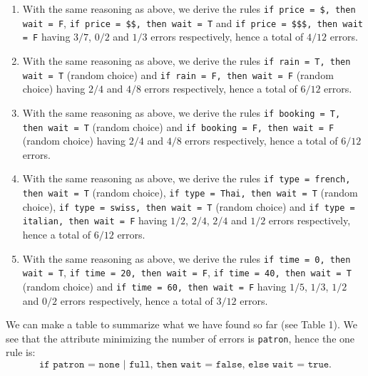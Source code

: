 \documentclass[fontsize=12pt, usenames, dvipsnames, headinclude, headsepline, footinclude, footsepline]{scrartcl}
\begin{document}
\begin{sol}
\begin{enumerate}
    \item With the same reasoning as above, we derive the rules \texttt{if price = \$, then wait = F},
      \texttt{if price = \$\$, then wait = T} and \texttt{if price = \$\$\$, then wait = F} having $3/7$,
      $0/2$ and $1/3$ errors respectively, hence a total of $4/12$ errors.

    \item With the same reasoning as above, we derive the rules \texttt{if rain = T, then wait = T} (random choice) and
      \texttt{if rain = F, then wait = F} (random choice) having $2/4$ and $4/8$ errors respectively, hence a total of $6/12$
      errors.

    \item With the same reasoning as above, we derive the rules \texttt{if booking = T, then wait = T} (random choice) and
      \texttt{if booking = F, then wait = F} (random choice) having $2/4$ and $4/8$ errors respectively, hence a total of $6/12$
      errors.

    \item With the same reasoning as above, we derive the rules \texttt{if type = french, then wait = T}
      (random choice), \texttt{if type = Thai, then wait = T} (random choice), \texttt{if type = swiss, then
        wait = T} (random choice) and \texttt{if type = italian, then wait = F} having $1/2$, $2/4$, $2/4$ and $1/2$
      errors respectively, hence a total of $6/12$ errors.

    \item With the same reasoning as above, we derive the rules \texttt{if time = 0, then wait = T},
      \texttt{if time = 20, then wait = F}, \texttt{if time = 40, then wait = T} (random choice) and \texttt{if time = 60, then wait = F} having $1/5$,
      $1/3$, $1/2$ and $0/2$ errors respectively, hence a total of $3/12$ errors.
    \end{enumerate}
    We can make a table to summarize what we have found so far (see Table 1). We see that the attribute
    minimizing the number of errors is \texttt{patron}, hence the one rule is: 
    \[ \mathtt{\text{if patron = none | full, then wait = false, else wait = true}}. \]
\end{sol}
\end{document}
